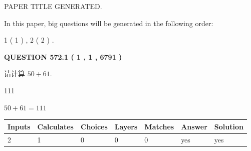 \documentclass{ctexart}
\begin{document}
   
 \vspace{0.2in}
 
 
 
 
   
   
 PAPER TITLE GENERATED.
   
   
   
\vspace{0.2in}
   
In this paper, big questions will be generated in the following order: 
   
   
   1 ( 1 )
 ,
   2 ( 2 )
 .
  
\vspace{0.2in}
  
{\textbf{\Large{QUESTION
572.1 
 ( 1 , 1 , 6791 )
}}}
  
  
 
请计算 $ %
50 +  %
61 $.
 
 
 
\noindent{}
 
 

111
 
 
\noindent{}
 
 

 
 
 
\noindent{}
 
 

$ %
50 +  %
61=   %
111$
 
 
\noindent{}
 
 

 
   
   
   
   
\noindent\begin{tabular}{|l|l|l|l|l|l|l|}
 \hline
Inputs & Calculates & Choices & Layers & Matches & Answer & Solution \\ \hline
 2  & 
 1  & 
 0
  & 
 0  & 
 0  & 
  yes & 
  yes 
  \\ \hline
 \end{tabular}
   
   
   
   
\noindent{}
   
   
  
\end{document}
